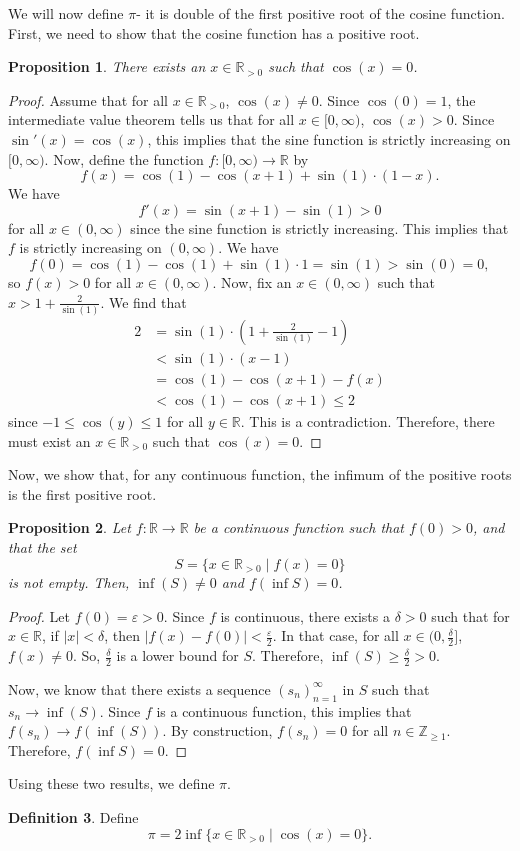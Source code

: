 \documentclass[a4paper, openany]{memoir}
\theoremstyle{definition}
\newtheorem{definition}{Definition}[section]
\theoremstyle{plain}
\newtheorem{proposition}[definition]{Proposition}
\begin{document}
We will now define $\pi$- it is double of the first positive root of the cosine function. First, we need to show that the cosine function has a positive root.
\begin{proposition}
There exists an $x \in \mathbb{R}_{> 0}$ such that $\cos (x) = 0$.
\end{proposition}
\begin{proof}
Assume that for all $x \in \mathbb{R}_{> 0}$, $\cos (x) \neq 0$. Since $\cos (0) = 1$, the intermediate value theorem tells us that for all $x \in [0, \infty)$, $\cos (x) > 0$. Since $\sin'(x) = \cos (x)$, this implies that the sine function is strictly increasing on $[0, \infty)$. Now, define the function $f: [0, \infty) \to \mathbb{R}$ by 
\[f(x) = \cos (1) - \cos (x + 1) + \sin (1) \cdot (1 - x).\]
We have
\[f'(x) = \sin (x + 1) - \sin (1) > 0\]
for all $x \in (0, \infty)$ since the sine function is strictly increasing. This implies that $f$ is strictly increasing on $(0, \infty)$. We have 
\[f(0) = \cos (1) - \cos (1) + \sin (1) \cdot 1 = \sin (1) > \sin (0) = 0,\]
so $f(x) > 0$ for all $x \in (0, \infty)$. Now, fix an $x \in (0, \infty)$ such that $x > 1 + \frac{2}{\sin (1)}$. We find that
\begin{align*}
    2 &= \sin (1) \cdot \left(1 + \frac{2}{\sin (1)}  - 1 \right) \\
    &< \sin (1) \cdot (x - 1) \\
    &= \cos (1) - \cos (x + 1) - f(x) \\
    &< \cos (1) - \cos (x + 1) \leqslant 2
\end{align*}
since $-1 \leqslant \cos (y) \leqslant 1$ for all $y \in \mathbb{R}$. This is a contradiction. Therefore, there must exist an $x \in \mathbb{R}_{> 0}$ such that $\cos (x) = 0$.
\end{proof}
\noindent Now, we show that, for any continuous function, the infimum of the positive roots is the first positive root.
\begin{proposition}
Let $f: \mathbb{R} \to \mathbb{R}$ be a continuous function such that $f(0) > 0$, and that the set
\[S = \{x \in \mathbb{R}_{> 0} \mid f(x) = 0\}\]
is not empty. Then, $\inf (S) \neq 0$ and $f(\inf S) = 0$.
\end{proposition}
\begin{proof}
Let $f(0) = \varepsilon > 0$. Since $f$ is continuous, there exists a $\delta > 0$ such that for $x \in \mathbb{R}$, if $|x| < \delta$, then $|f(x) - f(0)| < \frac{\varepsilon}{2}$. In that case, for all $x \in (0, \frac{\delta}{2}]$, $f(x) \neq 0$. So, $\frac{\delta}{2}$ is a lower bound for $S$. Therefore, $\inf (S) \geqslant \frac{\delta}{2} > 0$.

\noindent Now, we know that there exists a sequence $(s_n)_{n=1}^{\infty}$ in $S$ such that $s_n \to \inf (S)$. Since $f$ is a continuous function, this implies that $f(s_n) \to f(\inf (S))$. By construction, $f(s_n) = 0$ for all $n \in \mathbb{Z}_{\geqslant 1}$. Therefore, $f(\inf S) = 0$.
\end{proof}
\noindent Using these two results, we define $\pi$.
\begin{definition}
Define
\[\pi = 2 \inf \{x \in \mathbb{R}_{> 0} \mid \cos (x) = 0\}.\]
\end{definition}
\end{document}
